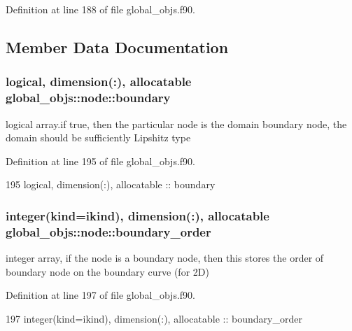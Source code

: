 Definition at line 188 of file global\+\_\+objs.\+f90.



\subsection{Member Data Documentation}
\subsubsection[{boundary}]{\setlength{\rightskip}{0pt plus 5cm}logical, dimension(\+:), allocatable global\+\_\+objs\+::node\+::boundary}\label{structglobal__objs_1_1node_aae148b03b33523c7b3164267bfe38a0b}


logical array.\+if true, then the particular node is the domain boundary node, the domain should be sufficiently Lipshitz type 



Definition at line 195 of file global\+\_\+objs.\+f90.


\begin{DoxyCode}
195     \textcolor{keywordtype}{logical}, \textcolor{keywordtype}{dimension(:)}, \textcolor{keywordtype}{allocatable}             :: boundary
\end{DoxyCode}
\subsubsection[{boundary\+\_\+order}]{\setlength{\rightskip}{0pt plus 5cm}integer(kind=ikind), dimension(\+:), allocatable global\+\_\+objs\+::node\+::boundary\+\_\+order}\label{structglobal__objs_1_1node_a27ddcfdc358fa391a367a4998ad90608}


integer array, if the node is a boundary node, then this stores the order of boundary node on the boundary curve (for 2D) 



Definition at line 197 of file global\+\_\+objs.\+f90.


\begin{DoxyCode}
197     \textcolor{keywordtype}{integer(kind=ikind)}, \textcolor{keywordtype}{dimension(:)}, \textcolor{keywordtype}{allocatable} :: boundary\_order
\end{DoxyCode}
